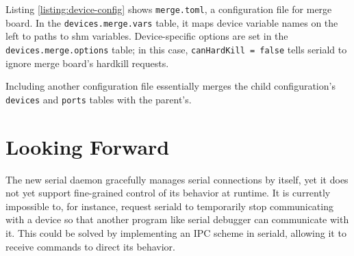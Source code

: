 \documentclass[11pt]{article}
\let\oldsection\section
\renewcommand\section{\clearpage\oldsection}
\begin{document}
Listing \ref{listing:device-config} shows \texttt{merge.toml}, a configuration file for merge board. In the \texttt{devices.merge.vars} table, it maps device variable names on the left to paths to shm variables. Device-specific options are set in the \texttt{devices.merge.options} table; in this case, \texttt{canHardKill = false} tells seriald to ignore merge board's hardkill requests.

Including another configuration file essentially merges the child configuration's \texttt{devices} and \texttt{ports} tables with the parent's.

\section{Looking Forward}

The new serial daemon gracefully manages serial connections by itself, yet it does not yet support fine-grained control of its behavior at runtime. It is currently impossible to, for instance, request seriald to temporarily stop communicating with a device so that another program like serial debugger can communicate with it. This could be solved by implementing an IPC scheme in seriald, allowing it to receive commands to direct its behavior.
\end{document}
